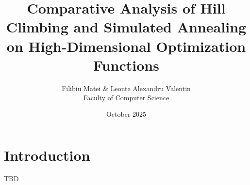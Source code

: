 \documentclass{article}
\title{
  \textbf{Comparative Analysis of Hill Climbing and Simulated Annealing}\\
  \textbf{on High-Dimensional Optimization Functions}
}
\author{
  Filibiu Matei \& Leonte Alexandru Valentin\\
  Faculty of Computer Science
}
\date{October 2025}
\begin{document}
\maketitle

\section{Introduction}
TBD
\end{document}
